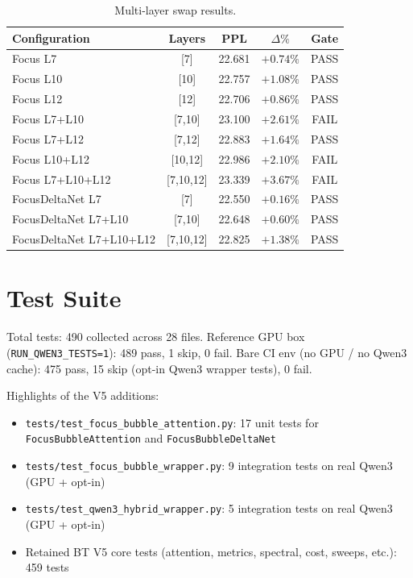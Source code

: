 \documentclass[11pt]{article}
\begin{document}
\begin{table}[h]
\centering
\begin{tabular}{lcccc}
\toprule
Configuration & Layers & PPL & $\Delta\%$ & Gate \\
\midrule
Focus L7 & [7] & 22.681 & $+0.74\%$ & PASS \\
Focus L10 & [10] & 22.757 & $+1.08\%$ & PASS \\
Focus L12 & [12] & 22.706 & $+0.86\%$ & PASS \\
Focus L7+L10 & [7,10] & 23.100 & $+2.61\%$ & FAIL \\
Focus L7+L12 & [7,12] & 22.883 & $+1.64\%$ & PASS \\
Focus L10+L12 & [10,12] & 22.986 & $+2.10\%$ & FAIL \\
Focus L7+L10+L12 & [7,10,12] & 23.339 & $+3.67\%$ & FAIL \\
\midrule
FocusDeltaNet L7 & [7] & 22.550 & $+0.16\%$ & PASS \\
FocusDeltaNet L7+L10 & [7,10] & 22.648 & $+0.60\%$ & PASS \\
FocusDeltaNet L7+L10+L12 & [7,10,12] & 22.825 & $+1.38\%$ & PASS \\
\bottomrule
\end{tabular}
\caption{Multi-layer swap results.}
\end{table}

\section{Test Suite}

Total tests: 490 collected across 28 files. Reference GPU box (\texttt{RUN\_QWEN3\_TESTS=1}): 489 pass, 1 skip, 0 fail. Bare CI env (no GPU / no Qwen3 cache): 475 pass, 15 skip (opt-in Qwen3 wrapper tests), 0 fail.

Highlights of the V5 additions:

\begin{itemize}
  \item \texttt{tests/test\_focus\_bubble\_attention.py}: 17 unit tests for \texttt{FocusBubbleAttention} and \texttt{FocusBubbleDeltaNet}
  \item \texttt{tests/test\_focus\_bubble\_wrapper.py}: 9 integration tests on real Qwen3 (GPU + opt-in)
  \item \texttt{tests/test\_qwen3\_hybrid\_wrapper.py}: 5 integration tests on real Qwen3 (GPU + opt-in)
  \item Retained BT V5 core tests (attention, metrics, spectral, cost, sweeps, etc.): 459 tests
\end{itemize}
\end{document}
